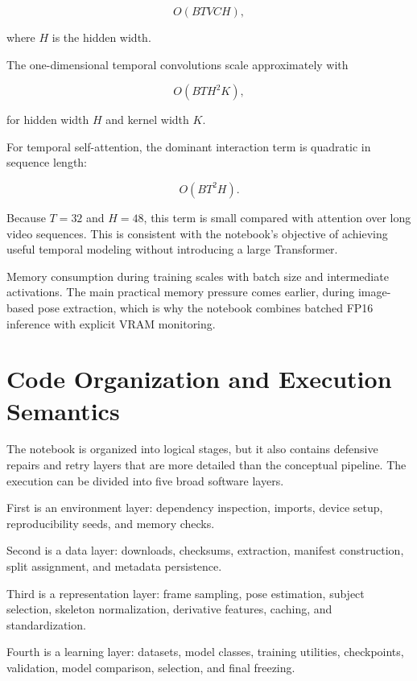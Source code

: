 \documentclass[11pt,a4paper]{article}
\begin{document}
\begin{equation}
O(BTVC H),
\end{equation}

where $H$ is the hidden width.

The one-dimensional temporal convolutions scale approximately with

\begin{equation}
O(BTH^2K),
\end{equation}

for hidden width $H$ and kernel width $K$.

For temporal self-attention, the dominant interaction term is quadratic in sequence length:

\begin{equation}
O(BT^2H).
\end{equation}

Because $T=32$ and $H=48$, this term is small compared with attention over long video sequences. This is consistent with the notebook's objective of achieving useful temporal modeling without introducing a large Transformer.

Memory consumption during training scales with batch size and intermediate activations. The main practical memory pressure comes earlier, during image-based pose extraction, which is why the notebook combines batched FP16 inference with explicit VRAM monitoring.

\section{Code Organization and Execution Semantics}

The notebook is organized into logical stages, but it also contains defensive repairs and retry layers that are more detailed than the conceptual pipeline. The execution can be divided into five broad software layers.

First is an environment layer: dependency inspection, imports, device setup, reproducibility seeds, and memory checks.

Second is a data layer: downloads, checksums, extraction, manifest construction, split assignment, and metadata persistence.

Third is a representation layer: frame sampling, pose estimation, subject selection, skeleton normalization, derivative features, caching, and standardization.

Fourth is a learning layer: datasets, model classes, training utilities, checkpoints, validation, model comparison, selection, and final freezing.
\end{document}
